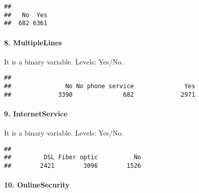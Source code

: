 \documentclass[
]{article}
\newenvironment{Shaded}{\begin{snugshade}}{\end{snugshade}}
\newcommand{\FunctionTok}[1]{\textcolor[rgb]{0.00,0.00,0.00}{#1}}
\newcommand{\NormalTok}[1]{#1}
\newcommand{\SpecialCharTok}[1]{\textcolor[rgb]{0.00,0.00,0.00}{#1}}
\begin{document}
\begin{Shaded}
\end{Shaded}

\begin{verbatim}
## 
##   No  Yes 
##  682 6361
\end{verbatim}

\hypertarget{multiplelines}{%
\paragraph{8. MultipleLines}\label{multiplelines}}

It is a binary variable. Levels: Yes/No.~

\begin{Shaded}
\end{Shaded}

\begin{verbatim}
## 
##               No No phone service              Yes 
##             3390              682             2971
\end{verbatim}

\hypertarget{internetservice}{%
\paragraph{9. InternetService}\label{internetservice}}

It is a binary variable. Levels: Yes/No.~

\begin{Shaded}
\end{Shaded}

\begin{verbatim}
## 
##         DSL Fiber optic          No 
##        2421        3096        1526
\end{verbatim}

\hypertarget{onlinesecurity}{%
\paragraph{10. OnlineSecurity}\label{onlinesecurity}}
\end{document}
